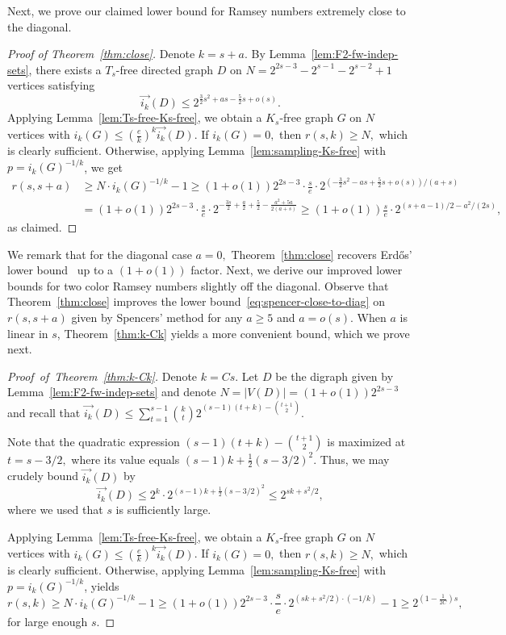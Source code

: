 \documentclass{article}
\theoremstyle{plain}
\theoremstyle{definition}
\newcommand{\fwi}[1]{\overrightarrow{i_{#1}}}
\begin{document}
Next, we prove our claimed lower bound for Ramsey numbers extremely close to the diagonal.

\begin{proof}[Proof of Theorem~\ref{thm:close}]
    Denote $k = s+a$. By Lemma~\ref{lem:F2-fw-indep-sets}, there exists a $T_s$-free directed graph $D$ on $N = 2^{2s-3} - 2^{s-1} - 2^{s-2} + 1$ vertices satisfying 
    \[ \fwi{k}(D) \le 2^{\frac{3}{2}s^2 + as - \frac{5}{2}s + o(s)}. \]    
    Applying Lemma~\ref{lem:Ts-free-Ks-free}, we obtain a $K_s$-free graph $G$ on $N$ vertices with $i_k(G) \le \left( \frac{e}{k}\right)^k \fwi{k}(D)$. If $i_k(G) = 0, $ then $r(s, k) \ge N,$ which is clearly sufficient. Otherwise, applying Lemma~\ref{lem:sampling-Ks-free} with $p = i_k(G)^{-1/k}$, we get
    \begin{align*}
        r(s, s+a) &\ge N \cdot i_k(G)^{-1/k} - 1 \ge (1+o(1))2^{2s-3} \cdot \frac{s}{e} \cdot 2^{(-\frac{3}{2}s^2 - as + \frac{5}{2}s + o(s)) / (a+s)}\\ &= (1+o(1))2^{2s-3} \cdot \frac{s}{e} \cdot 2^{-\frac{3s}{2} + \frac{a}{2} + \frac{5}{2} - \frac{a^2 + 5a}{2(a+s)}}
        \ge (1 + o(1)) \frac{s}{e}\cdot 2^{(s + a - 1)/2 - a^2 / (2s)},
    \end{align*}
    as claimed.
\end{proof}

We remark that for the diagonal case $a = 0,$ Theorem~\ref{thm:close} recovers Erd\H{o}s' lower bound~\cite{erdos-lb} up to a $(1 + o(1))$ factor. Next, we derive our improved lower bounds for two color Ramsey numbers slightly off the diagonal. Observe that Theorem~\ref{thm:close} improves the lower bound~\eqref{eq:spencer-close-to-diag} on $r(s, s+a)$ given by Spencers' method for any $a \ge 5$ and $a = o(s)$. When $a$ is linear in $s$, Theorem~\ref{thm:k-Ck} yields a more convenient bound, which we prove next.

\begin{proof}[Proof~of~Theorem~\ref{thm:k-Ck}]
    Denote $k = Cs$. Let $D$ be the digraph given by Lemma~\ref{lem:F2-fw-indep-sets} and denote $N = |V(D)| = (1+o(1)) 2^{2s-3}$ and recall that $\fwi{k}(D) \le \sum_{t=1}^{s-1} \binom{k}{t} 2^{(s-1)(t+k) - \binom{t+1}{2}}$.

    Note that the quadratic expression $(s-1)(t+k) - \binom{t+1}{2}$ is maximized at $t = s - 3/2,$ where its value equals $(s-1)k + \frac{1}{2}(s - 3/2)^2$. Thus, we may crudely bound $\fwi{k}(D)$ by
    \[ \fwi{k}(D) \le 2^k \cdot 2^{(s-1)k + \frac{1}{2}(s - 3/2)^2} \le  2^{sk + s^2/2}, \]
    where we used that $s$ is sufficiently large.

    Applying Lemma~\ref{lem:Ts-free-Ks-free}, we obtain a $K_s$-free graph $G$ on $N$ vertices with $i_k(G) \le \left( \frac{e}{k}\right)^k \fwi{k}(D)$. If $i_k(G) = 0, $ then $r(s, k) \ge N,$ which is clearly sufficient. Otherwise, applying Lemma~\ref{lem:sampling-Ks-free} with $p = i_k(G)^{-1/k}$, yields
    \[ r(s, k) \ge N \cdot i_k(G)^{-1/k} - 1 \ge (1 + o(1)) 2^{2s-3} \cdot \frac{s}{e} \cdot 2^{(sk + s^2/2) \cdot (-1 / k)} - 1 \ge 2^{\left(1 - \frac{1}{2C} \right)s}, \]
    for large enough $s$.
\end{proof}
\end{document}
